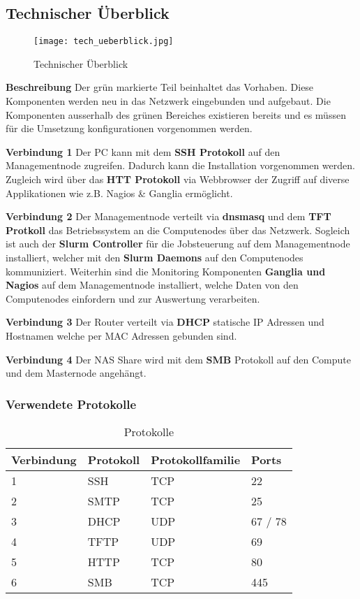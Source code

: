\subsection{Technischer Überblick}
\begin{figure}[H]
\centering
\texttt{[image: tech\_ueberblick.jpg]}
\caption{Technischer Überblick}
\label{fig:Technischer Überblick}
\end{figure} 

\textbf{Beschreibung}\newline
Der grün markierte Teil beinhaltet das Vorhaben. Diese Komponenten werden neu in das Netzwerk eingebunden und aufgebaut. Die Komponenten ausserhalb des grünen Bereiches existieren bereits und es müssen für die Umsetzung konfigurationen vorgenommen werden.

\textbf{Verbindung 1} \newline
Der PC kann mit dem \textbf{SSH Protokoll} auf den Managementnode zugreifen. Dadurch kann die Installation vorgenommen werden. Zugleich wird über das \textbf{HTT Protokoll} via Webbrowser der Zugriff auf diverse Applikationen wie z.B. Nagios \& Ganglia ermöglicht.

\textbf{Verbindung 2} \newline
Der Managementnode verteilt via \textbf{dnsmasq} und dem \textbf {TFT Protkoll} das Betriebssystem an die Computenodes über das Netzwerk. Sogleich ist auch der \textbf{Slurm Controller} für die Jobsteuerung auf dem Managementnode installiert, welcher mit den \textbf{Slurm Daemons} auf den Computenodes kommuniziert. Weiterhin sind die Monitoring Komponenten \textbf{Ganglia und Nagios} auf dem Managementnode installiert, welche Daten von den Computenodes einfordern und zur Auswertung verarbeiten.

\textbf{Verbindung 3} \newline
Der Router verteilt via \textbf{DHCP} statische IP Adressen und Hostnamen welche per MAC Adressen gebunden sind.

\textbf{Verbindung 4} \newline
Der NAS Share wird mit dem \textbf{SMB} Protokoll auf den Compute und dem Masternode angehängt.

\subsubsection{Verwendete Protokolle}
\begin{table}[H]
\centering
\begin{tabular}{p{2cm}p{4cm}p{5cm}p{5cm}}
\hline
\rowcolor{heading} \textbf{Verbindung} & \textbf{Protokoll} & \textbf{Protokollfamilie} & \textbf{Ports} \\\hline
1 & SSH & TCP & 22 \\\hline
2 & SMTP & TCP & 25 \\\hline
3 & DHCP & UDP & 67 / 78 \\\hline
4 & TFTP & UDP & 69 \\\hline
5 & HTTP & TCP & 80 \\\hline
6 & SMB & TCP & 445 \\\hline
\end{tabular}
\caption{Protokolle}
\end{table}
